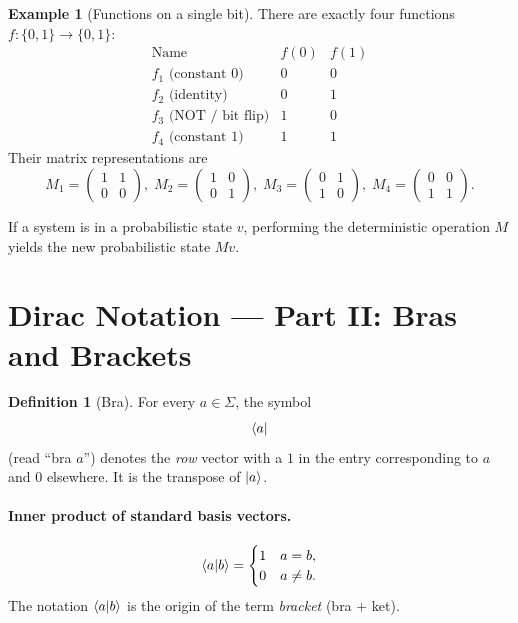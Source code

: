 \documentclass[11pt]{article}
\theoremstyle{definition}
\newtheorem{definition}{Definition}[section]
\newtheorem{example}{Example}[section]
\begin{document}
\begin{example}[Functions on a single bit]
There are exactly four functions $f:\{0,1\}\to\{0,1\}$:
\[
\begin{array}{c|c|c}
    \text{Name} & f(0) & f(1) \\\hline
    f_1\text{ (constant 0)} & 0 & 0 \\
    f_2\text{ (identity)}   & 0 & 1 \\
    f_3\text{ (NOT / bit flip)} & 1 & 0 \\
    f_4\text{ (constant 1)} & 1 & 1
\end{array}
\]
Their matrix representations are
\[
    M_1 = \begin{pmatrix}1&1\\0&0\end{pmatrix},\;
    M_2 = \begin{pmatrix}1&0\\0&1\end{pmatrix},\;
    M_3 = \begin{pmatrix}0&1\\1&0\end{pmatrix},\;
    M_4 = \begin{pmatrix}0&0\\1&1\end{pmatrix}.
\]
\end{example}

If a system is in a probabilistic state $v$, performing the deterministic operation $M$ yields the new probabilistic state $Mv$.

\section{Dirac Notation --- Part II: Bras and Brackets}

\begin{definition}[Bra]
For every $a\in\Sigma$, the symbol
\[
    \bra{a}
\]
(read ``bra $a$'') denotes the \emph{row} vector with a $1$ in the entry corresponding to $a$ and $0$ elsewhere.  It is the transpose of $\ket{a}$.
\end{definition}

\paragraph{Inner product of standard basis vectors.}
\[
    \braket{a}{b} = \begin{cases} 1 & a=b,\\ 0 & a\neq b.\end{cases}
\]
The notation $\braket{a}{b}$ is the origin of the term \emph{bracket} (bra + ket).
\end{document}
